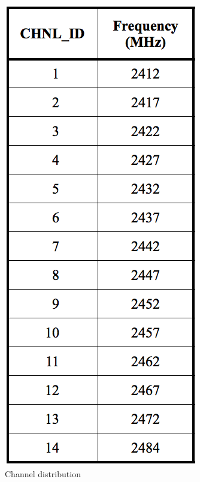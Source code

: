 	\begin{figure}
		\caption{Channel distribution}
		\label{fig:channels}
		\includegraphics[width=1\linewidth]{Images/Channels80211.png}
	\end{figure}


